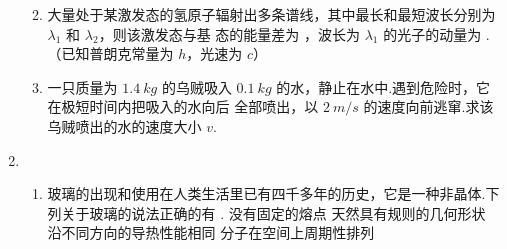 \begin{enumerate}
\begin{enumerate}





\item 
大量处于某激发态的氢原子辐射出多条谱线，其中最长和最短波长分别为 $ \lambda_{1} $ 和 $ \lambda_{2} $，则该激发态与基
态的能量差为 \underlinegap ，波长为 $ \lambda_{1} $ 的光子的动量为 \underlinegap .（已知普朗克常量为 $ h $，光速为 $ c $）






\item 
一只质量为 $ 1.4 \ kg $ 的乌贼吸入 $ 0.1 \ kg $ 的水，静止在水中.遇到危险时，它在极短时间内把吸入的水向后
全部喷出，以 $ 2 \ m/s $ 的速度向前逃窜.求该乌贼喷出的水的速度大小 $ v $.






\end{enumerate}









\newpage


\item 
\begin{enumerate}
\item
玻璃的出现和使用在人类生活里已有四千多年的历史，它是一种非晶体.下列关于玻璃的说法正确的有 \underlinegap .
\fourchoices
{没有固定的熔点}
{天然具有规则的几何形状}
{沿不同方向的导热性能相同}
{分子在空间上周期性排列}







\end{enumerate}
\end{enumerate}
